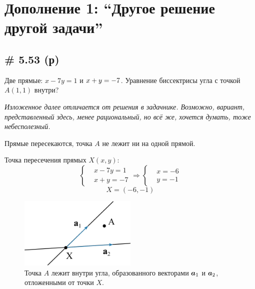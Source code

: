 \documentclass[a4paper,12pt]{article}
\begin{document}
  
  \section{Дополнение 1: ``Другое решение другой задачи''}
  
  \subsection{\# 5.53 (р)}
  
  \begin{problem}
    Две прямые: $x - 7y = 1$ и $x + y \hm= -7$.
    Уравнение биссектрисы угла с точкой $A(1, 1)$ внутри?
  \end{problem}
  
  \begin{solution}
    \emph{Изложенное далее отличается от решения в задачнике.
    Возможно, вариант, представленный здесь, менее рациональный, но всё же, хочется думать, тоже небесполезный.}
    
    Прямые пересекаются, точка $A$ не лежит ни на одной прямой.
      
    Точка пересечения прямых $X(x, y)$:
    \[
      \left\{\begin{aligned}
        &x - 7y = 1\\
        &x + y = -7
      \end{aligned}\right.
      \Rightarrow
      \left\{\begin{aligned}
        &x = -6\\
        &y = -1
      \end{aligned}\right.
    \]
    \[
      \boxed{X = (-6, -1)}
    \]
    
    \begin{figure}[h]
      \centering
      
      \includegraphics[width=0.5\textwidth]{5-53}
      
      \caption{Точка $A$ лежит внутри угла, образованного векторами $\boldsymbol a_1$ и $\boldsymbol a_2$, отложенными от точки $X$.}
      \label{fig:5-53}
    \end{figure}


\end{solution}
\end{document}
